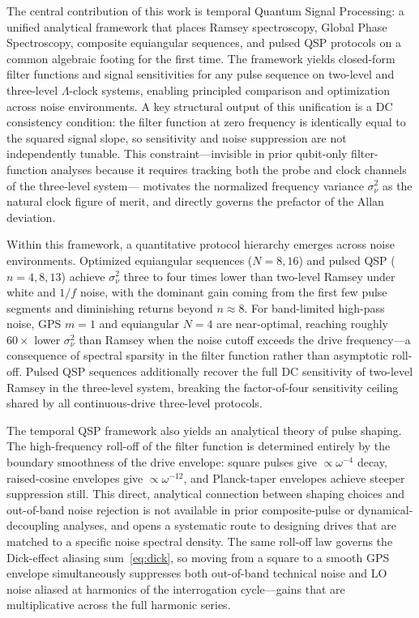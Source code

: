 \documentclass[aps,pra,twocolumn,superscriptaddress,longbibliography]{revtex4-2}
\begin{document}
The central contribution of this work is temporal Quantum Signal Processing: a unified
analytical framework that places Ramsey spectroscopy, Global Phase Spectroscopy,
composite equiangular sequences, and pulsed QSP protocols on a common algebraic
footing for the first time.
The framework yields closed-form filter functions and signal sensitivities for any
pulse sequence on two-level and three-level $\Lambda$-clock systems, enabling
principled comparison and optimization across noise environments.
A key structural output of this unification is a DC consistency condition: the filter
function at zero frequency is identically equal to the squared signal slope, so
sensitivity and noise suppression are not independently tunable.
This constraint---invisible in prior qubit-only filter-function analyses because it
requires tracking both the probe and clock channels of the three-level system---
motivates the normalized frequency variance $\sigma^2_\nu$ as the natural clock
figure of merit, and directly governs the prefactor of the Allan deviation.

Within this framework, a quantitative protocol hierarchy emerges across noise
environments.
Optimized equiangular sequences ($N=8,16$) and pulsed QSP ($n=4,8,13$) achieve
$\sigma^2_\nu$ three to four times lower than two-level Ramsey under white and $1/f$
noise, with the dominant gain coming from the first few pulse segments and diminishing
returns beyond $n\approx8$.
For band-limited high-pass noise, GPS $m=1$ and equiangular $N=4$ are near-optimal,
reaching roughly $60\times$ lower $\sigma^2_\nu$ than Ramsey when the noise cutoff
exceeds the drive frequency---a consequence of spectral sparsity in the filter
function rather than asymptotic roll-off.
Pulsed QSP sequences additionally recover the full DC sensitivity of two-level Ramsey
in the three-level system, breaking the factor-of-four sensitivity ceiling shared by
all continuous-drive three-level protocols.

The temporal QSP framework also yields an analytical theory of pulse shaping.
The high-frequency roll-off of the filter function is determined entirely by the
boundary smoothness of the drive envelope: square pulses give $\propto\omega^{-4}$
decay, raised-cosine envelopes give $\propto\omega^{-12}$, and Planck-taper envelopes
achieve steeper suppression still.
This direct, analytical connection between shaping choices and out-of-band noise
rejection is not available in prior composite-pulse or dynamical-decoupling analyses,
and opens a systematic route to designing drives that are matched to a specific noise
spectral density.
The same roll-off law governs the Dick-effect aliasing sum~\eqref{eq:dick}, so moving
from a square to a smooth GPS envelope simultaneously suppresses both out-of-band
technical noise and LO noise aliased at harmonics of the interrogation cycle---gains
that are multiplicative across the full harmonic series.
\end{document}
